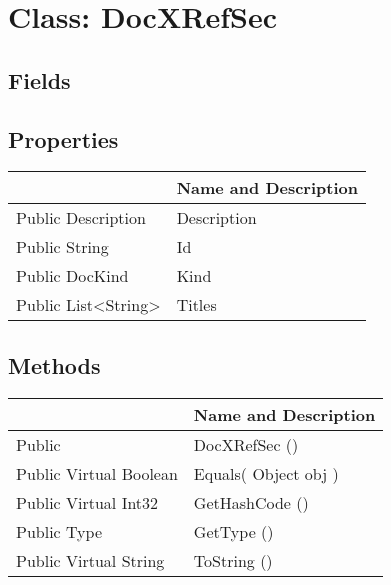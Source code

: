 \documentclass[11pt, oneside, a4paper]{book}
\begin{document}
\hypertarget{SoftwareEngineeringTools.{}Documentation.{}DocXRefSec}{}
\section{Class: DocXRefSec}

\subsection{Fields}

\subsection{Properties}
\begin{center}
\begin{tabular}{| p{3cm} | p{12cm} | }
\hline
\textbf{ } & \textbf{ Name and Description}\\
\hline
 Public  Description &  Description\hypertarget{SoftwareEngineeringTools.{}Documentation.{}DocXRefSec.{}Description}{}\\
\hline
 Public  String &  Id\hypertarget{SoftwareEngineeringTools.{}Documentation.{}DocXRefSec.{}Id}{}\\
\hline
 Public  DocKind &  Kind\hypertarget{SoftwareEngineeringTools.{}Documentation.{}DocXRefSec.{}Kind}{}\\
\hline
 Public  List<String> &  Titles\hypertarget{SoftwareEngineeringTools.{}Documentation.{}DocXRefSec.{}Titles}{}\\
\hline
\end{tabular}
\end{center}

\subsection{Methods}
\begin{center}
\begin{tabular}{| p{3cm} | p{12cm} | }
\hline
\textbf{ } & \textbf{ Name and Description}\\
\hline
 Public  &  DocXRefSec ()\hypertarget{SoftwareEngineeringTools.{}Documentation.{}DocXRefSec.{}DocXRefSec}{}\\
\hline
 Public  Virtual  Boolean &  Equals(\hypertarget{SoftwareEngineeringTools.{}Documentation.{}DocXRefSec.{}Equals\_Object}{} Object  obj  )\\
\hline
 Public  Virtual  Int32 &  GetHashCode ()\hypertarget{SoftwareEngineeringTools.{}Documentation.{}DocXRefSec.{}GetHashCode}{}\\
\hline
 Public  Type &  GetType ()\hypertarget{SoftwareEngineeringTools.{}Documentation.{}DocXRefSec.{}GetType}{}\\
\hline
 Public  Virtual  String &  ToString ()\hypertarget{SoftwareEngineeringTools.{}Documentation.{}DocXRefSec.{}ToString}{}\\
\hline
\end{tabular}
\end{center}
 
\end{document}
